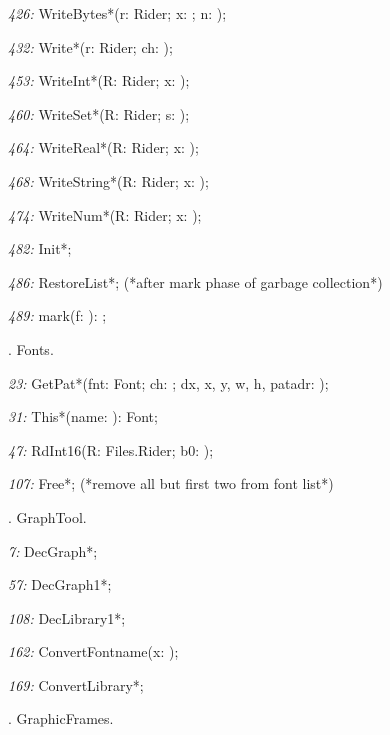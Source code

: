 \item{\it 426:} WriteBytes*(\VAR r: Rider; x: \ARRAYOF \BYTE; n: \INTEGER);
\item{\it 432:} Write*(\VAR r: Rider; ch: \CHAR);
\item{\it 453:} WriteInt*(\VAR R: Rider; x: \INTEGER);
\item{\it 460:} WriteSet*(\VAR R: Rider; s: \SET);
\item{\it 464:} WriteReal*(\VAR R: Rider; x: \REAL);
\item{\it 468:} WriteString*(\VAR R: Rider; x: \ARRAYOF\CHAR);
\item{\it 474:} WriteNum*(\VAR R: Rider; x: \INTEGER);
\item{\it 482:} Init*;
\item{\it 486:} RestoreList*; (*after mark phase of garbage collection*)
\item{\it 489:} mark(f: \INTEGER): \INTEGER;

. Fonts.

\item{\it 23:} GetPat*(fnt: Font; ch: \CHAR; \VAR dx, x, y, w, h, patadr: \INTEGER);
\item{\it 31:} This*(name: \ARRAYOF\CHAR): Font;
\item{\it 47:} RdInt16(\VAR R: Files.Rider; \VAR b0: \BYTE);
\item{\it 107:} Free*;  (*remove all but first two from font list*)

. GraphTool.

\item{\it 7:} DecGraph*;
\item{\it 57:} DecGraph1*;
\item{\it 108:} DecLibrary1*;
\item{\it 162:} ConvertFontname(\VAR x: \ARRAYOF\CHAR);
\item{\it 169:} ConvertLibrary*;

. GraphicFrames.

